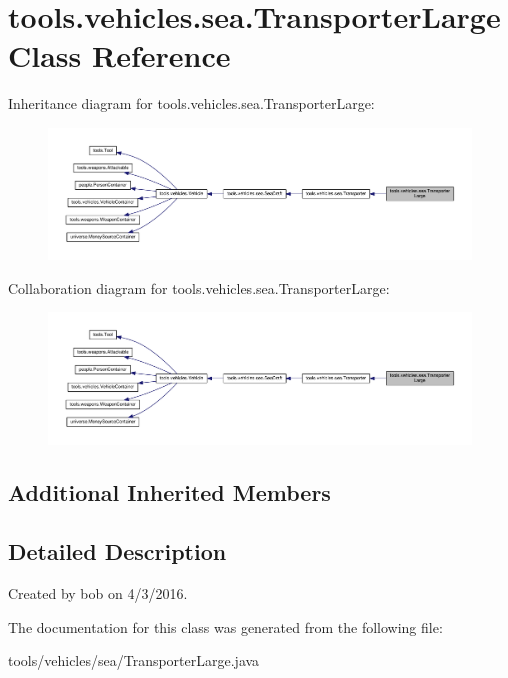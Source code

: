 \hypertarget{classtools_1_1vehicles_1_1sea_1_1_transporter_large}{}\section{tools.\+vehicles.\+sea.\+Transporter\+Large Class Reference}
\label{classtools_1_1vehicles_1_1sea_1_1_transporter_large}


Inheritance diagram for tools.\+vehicles.\+sea.\+Transporter\+Large\+:\nopagebreak
\begin{figure}[H]
\begin{center}
\leavevmode
\includegraphics[width=350pt]{classtools_1_1vehicles_1_1sea_1_1_transporter_large__inherit__graph}
\end{center}
\end{figure}


Collaboration diagram for tools.\+vehicles.\+sea.\+Transporter\+Large\+:\nopagebreak
\begin{figure}[H]
\begin{center}
\leavevmode
\includegraphics[width=350pt]{classtools_1_1vehicles_1_1sea_1_1_transporter_large__coll__graph}
\end{center}
\end{figure}
\subsection*{Additional Inherited Members}


\subsection{Detailed Description}
Created by bob on 4/3/2016. 

The documentation for this class was generated from the following file\+:\begin{DoxyCompactItemize}
\item 
tools/vehicles/sea/Transporter\+Large.\+java\end{DoxyCompactItemize}
